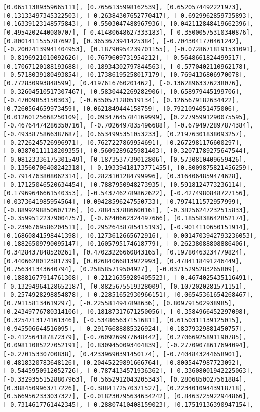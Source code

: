 \documentclass[11pt]{article}
\begin{document}
\begin{Verbatim}[commandchars=\\\{\}]
[0.06511389359665111], [0.7656135998162539], [0.6520574492221973], [0.13133497345322503], [-0.26384307652770417], [-0.6929962859735893], [0.16339123148575843], [-0.5503047488967936], [0.042112848419662396], [0.4954202440080707], [-0.41480648627333183], [-0.35000575310340876], [0.8001411555787692], [0.3653673941425384], [-0.7043041770461242], [-0.20024139941404953], [0.18790954239701155], [-0.07286718191531091], [-0.8196921010092626], [0.7679609731954212], [-0.5648661824499517], [0.17067120188193688], [0.18934302797844563], [-0.5770402110962178], [-0.5718039180493854], [0.17386195258017179], [0.7694136806970078], [0.772830993848599], [0.4197616760201462], [-0.13628963376238076], [-0.32604510517307467], [0.5830442269282906], [0.658979445199706], [-0.47009853150303], [-0.6350571280519134], [0.1265679182634422], [0.7260564659973459], [0.0621849444158759], [0.7921094051475006], [0.01260125668250109], [0.09347645784169999], [0.27795991290075595], [-0.46764474286350716], [-0.7026497835496688], [-0.6794972897874384], [-0.4933875866387687], [0.6534995351053233], [0.21976301838093257], [-0.2726245726996971], [0.7627227869954691], [0.2672981176600297], [-0.03870111118209355], [0.5609289625981403], [0.32071789275647544], [-0.08123336175301549], [0.1873537739012806], [0.5730810409659426], [-0.13560706408242318], [-0.19339418173771455], [0.8009875821456259], [-0.7914763808062314], [0.2823101284799996], [0.3164064859474628], [-0.17125046520634454], [0.7887950948273935], [0.5918124773236114], [0.17969646661540353], [-0.5437462789862622], [-0.4274980848727156], [0.0373641985954564], [0.09428596247550733], [0.7974111572957999], [-0.8899298850607126], [0.7884537886600161], [-0.38256247232515833], [-0.35995122379004757], [-0.6240662324497666], [0.1855838642852174], [-0.2396769586204511], [0.29526438785415193], [-0.9014110650151914], [0.16860841598441398], [0.1273612665672916], [-0.0014703942793236053], [0.18826509790095147], [0.1605795174618779], [-0.26238088808886406], [0.3428437848520261], [0.47023226660843165], [0.19780463234779824], [0.4406628012381739], [0.02684066813922993], [0.4784118491246449], [0.756341343640794], [0.258585719504927], [-0.03715295283265809], [0.18881677914761308], [-0.21216359289405523], [-0.4674025435116491], [-0.13294964128652187], [0.8825675519328009], [0.1072020281571151], [-0.2574928298854878], [-0.22851652930966151], [0.06545361654268467], [0.791158134619297], [-0.2255814947898636], [0.809791502938985], [0.24349776780314106], [0.18187317671250056], [-0.3584966452297098], [0.3254713174161346], [-0.5348656371516811], [0.6150311139125015], [0.945506644516095], [-0.29176688885326924], [0.18379329881450757], [-0.412564187872379], [-0.7609269977648442], [0.27066925891190785], [0.09811085227052191], [0.8309450093404839], [-0.27709078617694094], [-0.27015330700838], [0.42339690391450174], [-0.7404843244658901], [0.4818320783648126], [0.20445229891666764], [0.8005447987723092], [-0.5445950912052726], [-0.7874134571936362], [-0.33608001942225063], [-0.33293551528807963], [0.5652912043205343], [0.2806850027561884], [0.3884509963717226], [-0.3884172570371527], [0.22340109443918718], [0.5669562333037327], [-0.018230795634634242], [0.8463725922944866], [-0.7314617761442345], [-0.28807410408159023], [0.17519136390947154], 
\end{Verbatim}
\end{document}
